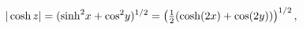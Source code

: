 \[|\mathop{\cosh\/}\nolimits z|=({\mathop{\sinh\/}\nolimits^{2}}x+{\mathop{\cos%
\/}\nolimits^{2}}y)^{1/2}=\left(\tfrac{1}{2}(\mathop{\cosh\/}\nolimits\!\left(%
2x\right)+\mathop{\cos\/}\nolimits\!\left(2y\right))\right)^{1/2},\]